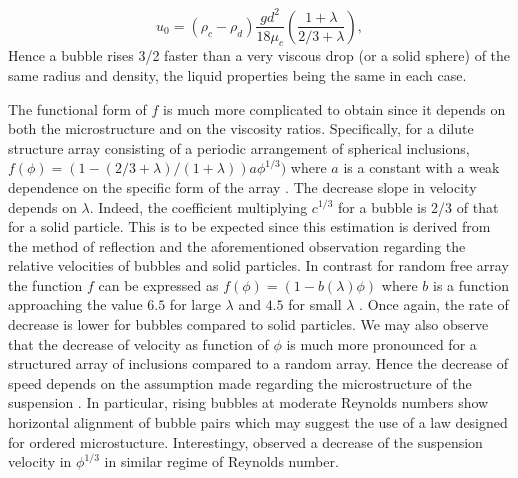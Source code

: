 

\begin{equation}
    u_0
    = (\rho_c - \rho_d)\frac{g d^2}{18\mu_c}\left(\frac{1+\lambda}{2/3 + \lambda}\right),
\end{equation}
Hence a bubble rises 3/2 faster than a very viscous drop (or a solid sphere) of the same radius and density, the liquid properties being the same in each case.

The functional form of $f$ is much more complicated to obtain since it depends on both the microstructure and on the viscosity ratios. Specifically, for a dilute structure array consisting of a periodic arrangement of spherical inclusions, $f(\phi) =(1 - (2/3+\lambda)/(1+\lambda))a\phi^{1/3})$ where $a$ is a constant with a weak dependence on the specific form of the array \citep{sangani1987}. The decrease slope in velocity depends on $\lambda$. Indeed, the coefficient multiplying $c^{1/3}$ for a bubble is 2/3 of that for a solid particle. This is to be expected since this estimation is derived from the method of reflection and the aforementioned observation regarding the relative velocities of bubbles and solid particles. In contrast for random free array the function $f$ can be expressed as  $f(\phi) = (1-b(\lambda)\phi)$ where $b$ is a function approaching the value $6.5$ for large $\lambda$ and $4.5$ for small $\lambda$ \citep{wacholder1973,haber1981}. Once again, the rate of decrease is lower for bubbles compared to solid particles. We may also observe that the decrease of velocity as function of $\phi$ is much more pronounced for a structured array of inclusions compared to a random array. Hence the decrease of speed depends on the assumption made regarding the microstructure of the suspension \citep{davis1985}. In particular, rising bubbles at moderate Reynolds numbers show horizontal alignment of bubble pairs \citep{bunner2002,yin2006} which may suggest the use of a law designed for ordered microstucture. Interestingy, \citet{loisy2017} observed a decrease of the suspension velocity in $\phi^{1/3}$ in similar regime of Reynolds number. 



